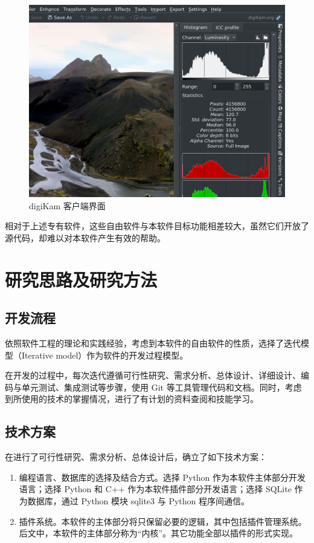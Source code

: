 \begin{figure}[h]
    \centering
    \includegraphics[width=\textwidth]{figures/digikam.jpg}
    \caption{digiKam 客户端界面}
    \label{fig:digikam}
\end{figure}

相对于上述专有软件，这些自由软件与本软件目标功能相差较大，虽然它们开放了源代码，却难以对本软件产生有效的帮助。

\section{研究思路及研究方法}

\subsection{开发流程}

依照软件工程的理论和实践经验，考虑到本软件的自由软件的性质，选择了迭代模型（Iterative model）作为软件的开发过程模型。

在开发的过程中，每次迭代遵循可行性研究、需求分析、总体设计、详细设计、编码与单元测试、集成测试等步骤，使用 Git 等工具管理代码和文档。同时，考虑到所使用的技术的掌握情况，进行了有计划的资料查阅和技能学习。

\subsection{技术方案}

在进行了可行性研究、需求分析、总体设计后，确立了如下技术方案：

\begin{enumerate}
    \item 编程语言、数据库的选择及结合方式。选择 Python 作为本软件主体部分开发语言；选择 Python 和 C++ 作为本软件插件部分开发语言；选择 SQLite 作为数据库，通过 Python 模块 sqlite3 与 Python 程序间通信。
    \item 插件系统。本软件的主体部分将只保留必要的逻辑，其中包括插件管理系统。后文中，本软件的主体部分称为“内核”。其它功能全部以插件的形式实现。
\end{enumerate}

